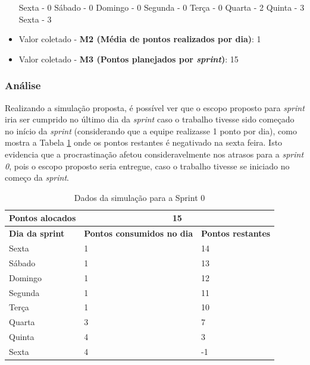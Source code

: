\begin{apendicesenv}
\begin{itemize}
		\subitem Sexta - 0
		\subitem Sábado - 0
		\subitem Domingo - 0
		\subitem Segunda - 0
		\subitem Terça - 0
		\subitem Quarta - 2
		\subitem Quinta - 3
		\subitem Sexta - 3
	      
	      \item Valor coletado - \textbf{M2 (Média de pontos realizados por dia)}: 1
	      \item Valor coletado - \textbf{M3 (Pontos planejados por \textit{sprint})}: 15
	    \end{itemize}
	    
	    \subsubsection*{Análise}
	    
	    Realizando a simulação proposta, é possível ver que o escopo proposto para \textit{sprint} iria ser cumprido
	    no último dia da \textit{sprint} caso o trabalho tivesse sido começado no início da \textit{sprint} 
	    (considerando que a equipe realizasse 1 ponto por dia),
	    como mostra a Tabela \ref{sprint0-sim} onde os pontos restantes é negativado na sexta feira.
	    Isto evidencia que a procrastinação afetou consideravelmente nos atrasos para a \textit{sprint 0},
	    pois o escopo proposto seria entregue, caso o trabalho tivesse se iniciado no começo da \textit{sprint}.
		
	    \begin{table}[h]
	    \centering
	    \caption{Dados da simulação para a Sprint 0}
	    \label{sprint0-sim}
	    \begin{tabular}{|l|l|l|}
	    \hline
	    \textbf{Pontos alocados} & \multicolumn{2}{c|}{\textbf{15}}                              \\ \hline
	    \textbf{Dia da sprint}   & \textbf{Pontos consumidos no dia} & \textbf{Pontos restantes} \\ \hline
	    Sexta                    & 1                                 & 14                        \\ \hline
	    Sábado                   & 1                                 & 13                        \\ \hline
	    Domingo                  & 1                                 & 12                        \\ \hline
	    Segunda                  & 1                                 & 11                        \\ \hline
	    Terça                    & 1                                 & 10                        \\ \hline
	    Quarta                   & 3                                 & 7                         \\ \hline
	    Quinta                   & 4                                 & 3                         \\ \hline
	    Sexta                    & 4                                 & -1                        \\ \hline
	    \end{tabular}
	    \end{table}
	  

\end{apendicesenv}
